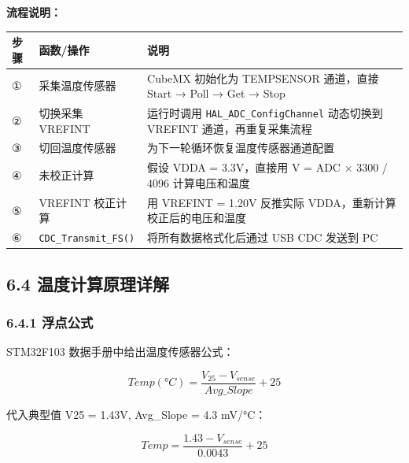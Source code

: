 \documentclass[
  chinese,
  UTF8,
  oneside,
  openany]{ctexbook}
\begin{document}
\textbf{流程说明：}

\begin{longtable}[]{@{}
  >{\raggedright\arraybackslash}p{}
  >{\raggedright\arraybackslash}p{}
  >{\raggedright\arraybackslash}p{}@{}}
\toprule\noalign{}
\begin{minipage}[b]{\linewidth}\raggedright
步骤
\end{minipage} & \begin{minipage}[b]{\linewidth}\raggedright
函数/操作
\end{minipage} & \begin{minipage}[b]{\linewidth}\raggedright
说明
\end{minipage} \\
\midrule\noalign{}
\endhead
\bottomrule\noalign{}
\endlastfoot
① & 采集温度传感器 & CubeMX 初始化为 TEMPSENSOR 通道，直接 Start → Poll
→ Get → Stop \\
② & 切换采集 VREFINT & 运行时调用 \texttt{HAL\_ADC\_ConfigChannel}
动态切换到 VREFINT 通道，再重复采集流程 \\
③ & 切回温度传感器 & 为下一轮循环恢复温度传感器通道配置 \\
④ & 未校正计算 & 假设 VDDA = 3.3V，直接用 V = ADC × 3300 / 4096
计算电压和温度 \\
⑤ & VREFINT 校正计算 & 用 VREFINT = 1.20V 反推实际
VDDA，重新计算校正后的电压和温度 \\
⑥ & \texttt{CDC\_Transmit\_FS()} & 将所有数据格式化后通过 USB CDC 发送到
PC \\
\end{longtable}

\subsection{6.4
温度计算原理详解}\label{ux6e29ux5ea6ux8ba1ux7b97ux539fux7406ux8be6ux89e3}

\subsubsection{6.4.1 浮点公式}\label{ux6d6eux70b9ux516cux5f0f}

STM32F103 数据手册中给出温度传感器公式：

\[Temp(°C) = \frac{V_{25} - V_{sense}}{Avg\_Slope} + 25\]

代入典型值 V25 = 1.43V, Avg\_Slope = 4.3 mV/°C：

\[Temp = \frac{1.43 - V_{sense}}{0.0043} + 25\]
\end{document}
